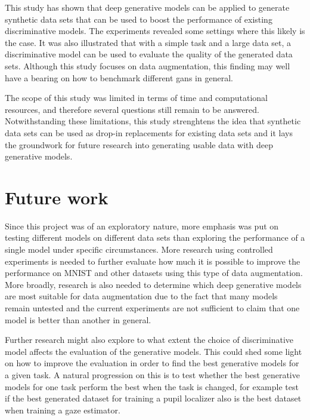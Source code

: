 This study has shown that deep generative models can be applied to generate synthetic data sets that can be used to boost the performance of existing discriminative models. The experiments revealed some settings where this likely is the case. It was also illustrated that with a simple task and a large data set, a discriminative model can be used to evaluate the quality of the generated data sets. Although this study focuses on data augmentation, this finding may well have a bearing on how to benchmark different \acrshort{gans} in general. 

The scope of this study was limited in terms of time and computational resources, and therefore several questions still remain to be answered. Notwithstanding these limitations, this study strenghtens the idea that synthetic data sets can be used as drop-in replacements for existing data sets and it lays the groundwork for future research into generating usable data with deep generative models.

\section{Future work}
Since this project was of an exploratory nature, more emphasis was put on testing different models on different data sets than exploring the performance of a single model under specific circumstances. More research using controlled experiments is needed to further evaluate how much it is possible to improve the performance on MNIST and other datasets using this type of data augmentation. More broadly, research is also needed to determine which deep generative models are most suitable for data augmentation due to the fact that many models remain untested and the current experiments are not sufficient to claim that one model is better than another in general.

Further research might also explore to what extent the choice of discriminative model affects the evaluation of the generative models. This could shed some light on how to improve the evaluation in order to find the best generative models for a given task. A natural progression on this is to test whether the best generative models for one task perform the best when the task is changed, for example test if the best generated dataset for training a pupil localizer also is the best dataset when training a gaze estimator.



